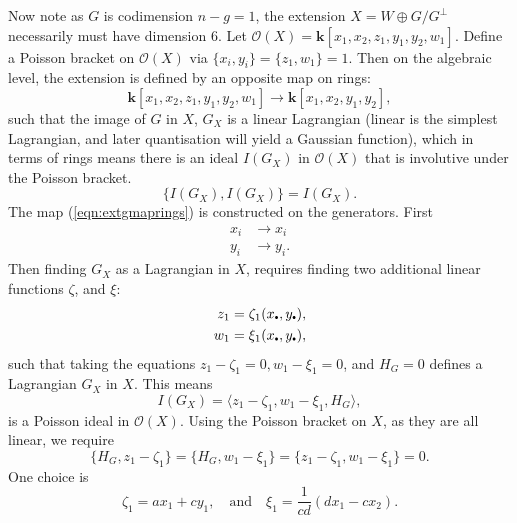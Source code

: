     Now note as \(G\) is codimension \(n-g=1\), the extension \(X = W\oplus G/G^{\perp}\) necessarily must have dimension \(6\). Let \( \mathcal{O}(X) = \mathbf{k}[x_1,x_2,z_1, y_1,y_2,w_1]\). Define a Poisson bracket  on \(\mathcal{O}(X)\) via \( \{x_i,y_i\}=\{z_1,w_1\} = 1\). Then on the algebraic level, the extension is defined by an opposite map on rings:
    \begin{equation} 
    \label{eqn:extgmaprings}
    \mathbf{k}[x_1,x_2,z_1,y_1,y_2,w_1] \rightarrow \mathbf{k}[x_1,x_2,y_1,y_2],
    \end{equation}
    such that the image of \(G\) in \(X\), \(G_X\) is a linear Lagrangian (linear is the simplest Lagrangian, and later quantisation will yield a Gaussian function), which in terms of rings means there is an ideal \(I(G_X)\) in \(\mathcal{O}(X)\) that is involutive under the Poisson bracket. 
    \[ \{I(G_X),I(G_X)\} = I(G_X).\]
    The map (\ref{eqn:extgmaprings}) is constructed on the generators. First 
    \begin{align*}
    x_i & \rightarrow x_i  \\
    y_i  & \rightarrow y_i.
    \end{align*}
    Then finding \(G_X\) as a Lagrangian in \(X\), requires finding two additional linear functions \(\zeta\), and \(\xi\):
    \begin{align}
    \label{eqn:solveforext}
    z_1 &= \zeta_1(x_{\sbt},y_{\sbt}), \\
    w_1 &= \xi_1(x_{\sbt},y_{\sbt}),
    \end{align}
    such that taking the equations \( z_1 - \zeta_1 = 0, w_1 - \xi_1 = 0\), and \(H_G = 0\) defines a Lagrangian \(G_X\) in \(X\). This means 
    \[ I(G_X)= \langle z_1 - \zeta_1,  w_1 - \xi_1, H_G \rangle, \]
    is a Poisson ideal in \(\mathcal{O}(X)\).  Using the Poisson bracket on \(X\), as they are all linear, we require 
    \[ \{H_G,z_1 -\zeta_1\} = \{ H_G,w_1 - \xi_1\} =   \{z_1 - \zeta_1,w_1 - \xi_1\} = 0.\]
    One choice is 
    \[\zeta_1 = a x_1 + c y_1, \quad  \text{and} \quad  \xi_1 = \frac{1}{cd} \left( d x_1 - c x_2 \right) .\]
